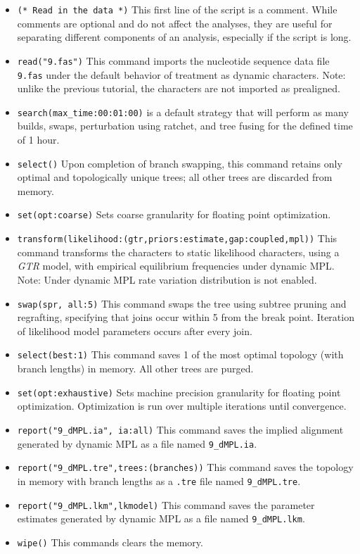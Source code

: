 \begin{itemize}
\item \texttt{(* Read in the data *)} This first line of the script is a comment. While comments are 
optional and do not affect the analyses, they are useful for separating different components of an analysis, 
especially if the script is long.  
\item \texttt{read("9.fas")} This command imports the nucleotide sequence data file \texttt{9.fas} under the 
default behavior of treatment as dynamic characters. Note: unlike the previous tutorial, the characters are not 
imported as prealigned.
\item \texttt{search(max\_time:00:01:00)}  is a default strategy that will perform as many builds, 
swaps, perturbation using ratchet, and tree fusing for the defined time of 1 hour.
\item \texttt{select()} Upon completion of branch swapping, this command retains only optimal and topologically
 unique trees; all other trees are discarded from memory.
 
\item \texttt{set(opt:coarse)} Sets coarse granularity for floating point optimization.
\item \texttt{transform(likelihood:(gtr,priors:estimate,gap:coupled,mpl))} This command transforms the 
characters to static likelihood characters, using a \emph{GTR} model, with empirical equilibrium frequencies under 
dynamic MPL. Note: Under dynamic MPL rate variation distribution is not enabled.
\item \texttt{swap(spr, all:5)} This command swaps the tree using subtree pruning and regrafting, specifying that joins occur
within 5 from the break point. Iteration of likelihood model parameters occurs after every join.
\item \texttt{select(best:1)} This command saves 1 of the most optimal topology (with branch lengths) in 
memory. All other trees are purged.
\item \texttt{set(opt:exhaustive)} Sets machine precision granularity for floating point optimization. Optimization is run over
multiple iterations until convergence.
\item \texttt{report("9\_dMPL.ia", ia:all)} This command saves the implied
    alignment generated by dynamic MPL as a file named \texttt{9\_dMPL.ia}.
\item \texttt{report("9\_dMPL.tre",trees:(branches))} This command saves the topology in memory with 
branch lengths as a \texttt{.tre} file named \texttt{9\_dMPL.tre}.
\item \texttt{report("9\_dMPL.lkm",lkmodel)} This command saves the parameter estimates generated 
by dynamic MPL as a file named \texttt{9\_dMPL.lkm}.
\item \texttt{wipe()} This commands clears the memory.


\end{itemize}
